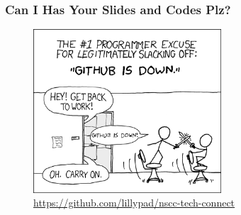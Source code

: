 \documentclass[aspectratio=169]{beamer}
\begin{document}
\begin{frame}
  \frametitle{Can I Has Your Slides and Codes Plz?}
  \begin{center}
    \begin{figure}
      \includegraphics[width=7cm,keepaspectratio]{git_meme}
      \caption{\href{https://github.com/lillypad/nscc-tech-connect}{https://github.com/lillypad/nscc-tech-connect}}
    \end{figure}
  \end{center}
\end{frame}
\end{document}
